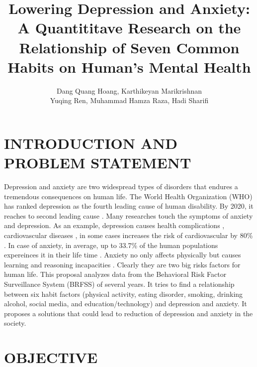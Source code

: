\documentclass[letterpaper, 10 pt, conference]{ieeeconf}  %
\title{\LARGE \bf
Lowering Depression and Anxiety: A Quantititave Research on the Relationship of Seven Common Habits 
on Human's Mental Health
}
\author{Dang Quang Hoang, Karthikeyan Marikrishnan \\ Yuqing Ren, Muhammad Hamza Raza, Hadi Sharifi}
\begin{document}
\maketitle
\thispagestyle{empty}
\pagestyle{empty}






\section{INTRODUCTION AND PROBLEM STATEMENT}
Depression and anxiety are two widespread types of disorders that endures a tremendous consequences on human life.  
The World Health Organization (WHO) has ranked depression as the fourth leading cause of human disability.
By 2020, it reaches to second leading cause \cite{kessler2013epidemiology}. Many researches touch the symptoms of anxiety and depression.
As an example, depression causes health 
complications \cite{verma2017impact}, cardiovascular diseases \cite{bradley2015depression}, in some cases increases 
the risk of cardiovascular by 80\% \cite{penninx2017depression}. In case of anxiety, in average, up to 33.7\% of 
the human populations expereinces it in their life time \cite{bandelow2015epidemiology}. Anxiety no only affects physically
but causes learning and reasoning incapacities \cite{spielberger2013effects}\cite{darke1988effects}. 
Clearly they are two big risks factors for human life.
This proposal analyzes data from the Behavioral Risk Factor Surveillance System (BRFSS) of several years. 
It tries to find a relationship between six habit factors (physical activity, eating disorder, 
smoking, drinking alcohol, social media, and education/technology) and depression and anxiety. It proposes a
solutions that could lead to reduction of depression and anxiety in the society. 

\section{OBJECTIVE}
\end{document}
